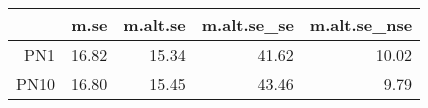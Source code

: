\begin{table}[ht]
\centering
\begin{tabular}{rrrrr}
  \hline
 & m.se & m.alt.se & m.alt.se\_se & m.alt.se\_nse \\ 
  \hline
PN1 & 16.82 & 15.34 & 41.62 & 10.02 \\ 
  PN10 & 16.80 & 15.45 & 43.46 & 9.79 \\ 
   \hline
\end{tabular}
\end{table}
